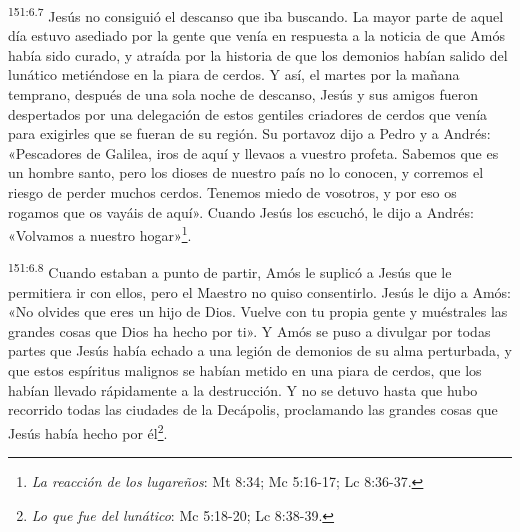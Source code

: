 \par
\textsuperscript{151:6.7} Jesús no consiguió el descanso que iba buscando. La mayor parte de aquel día estuvo asediado por la gente que venía en respuesta a la noticia de que Amós había sido curado, y atraída por la historia de que los demonios habían salido del lunático metiéndose en la piara de cerdos. Y así, el martes por la mañana temprano, después de una sola noche de descanso, Jesús y sus amigos fueron despertados por una delegación de estos gentiles criadores de cerdos que venía para exigirles que se fueran de su región. Su portavoz dijo a Pedro y a Andrés: «Pescadores de Galilea, iros de aquí y llevaos a vuestro profeta. Sabemos que es un hombre santo, pero los dioses de nuestro país no lo conocen, y corremos el riesgo de perder muchos cerdos. Tenemos miedo de vosotros, y por eso os rogamos que os vayáis de aquí». Cuando Jesús los escuchó, le dijo a Andrés: «Volvamos a nuestro hogar»\footnote{\textit{La reacción de los lugareños}: Mt 8:34; Mc 5:16-17; Lc 8:36-37.}.

\par
\textsuperscript{151:6.8} Cuando estaban a punto de partir, Amós le suplicó a Jesús que le permitiera ir con ellos, pero el Maestro no quiso consentirlo. Jesús le dijo a Amós: «No olvides que eres un hijo de Dios. Vuelve con tu propia gente y muéstrales las grandes cosas que Dios ha hecho por ti». Y Amós se puso a divulgar por todas partes que Jesús había echado a una legión de demonios de su alma perturbada, y que estos espíritus malignos se habían metido en una piara de cerdos, que los habían llevado rápidamente a la destrucción. Y no se detuvo hasta que hubo recorrido todas las ciudades de la Decápolis, proclamando las grandes cosas que Jesús había hecho por él\footnote{\textit{Lo que fue del lunático}: Mc 5:18-20; Lc 8:38-39.}.